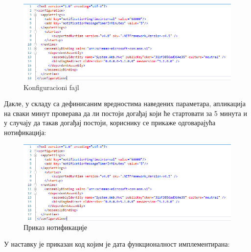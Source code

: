 \begin{figure}[H]
	\centering
	\includegraphics[scale=0.5]{slike/AppConfig.png}
	\caption{Konfiguracioni fajl}
	\label{fig:app_config}
\end{figure}

Дакле, у складу са дефинисаним вредностима наведених параметара, апликација на сваки минут проверава да ли постоји догађај који ће стартовати за 5 минута и у случају да такав догађај постоји, кориснику се прикаже одговарајућа нотификација:

\begin{figure}[H]
	\centering
	\includegraphics[scale=0.5]{slike/AppConfig.png}
	\caption{Приказ нотификације}
	\label{fig:event_notification}
\end{figure}

У наставку је приказан код којим је дата функционалност имплементирана:

